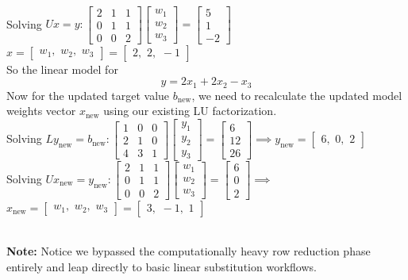 \documentclass[DIV=20,oneside]{scrartcl}
\newcommand{\note}{
	\noindent\textbf{\\Note: }
}
\begin{document}
\\Solving $Ux = y: \begin{bmatrix} 2 & 1 & 1 \\ 0 & 1 & 1 \\ 0 & 0 & 2 \end{bmatrix} \begin{bmatrix} w_1 \\ w_2 \\ w_3 \end{bmatrix} = \begin{bmatrix} 5 \\ 1 \\ -2 \end{bmatrix}$
$x = \begin{bmatrix} w_1, \,\, w_2, \,\, w_3 \end{bmatrix} = \begin{bmatrix} 2, \,\, 2, \,\, -1 \end{bmatrix}$
\\So the linear model for 
$$y=2x_1+2x_2-x_3$$
Now for the updated target value $b_{\text{new}}$, we need to recalculate the updated model weights vector $x_{\text{new}}$ using our existing LU factorization.
\\Solving $Ly_{\text{new}} = b_{\text{new}}:\begin{bmatrix} 1 & 0 & 0 \\ 2 & 1 & 0 \\ 4 & 3 & 1 \end{bmatrix} \begin{bmatrix} y_1 \\ y_2 \\ y_3 \end{bmatrix} = \begin{bmatrix} 6 \\ 12 \\ 26 \end{bmatrix}\implies y_{\text{new}} = \begin{bmatrix} 6, \,\, 0, \,\, 2 \end{bmatrix}$\\
Solving $Ux_{\text{new}} = y_{\text{new}}: \begin{bmatrix} 2 & 1 & 1 \\ 0 & 1 & 1 \\ 0 & 0 & 2 \end{bmatrix} \begin{bmatrix} w_1 \\ w_2 \\ w_3 \end{bmatrix} = \begin{bmatrix} 6 \\ 0 \\ 2 \end{bmatrix}\implies $$x_{\text{new}} = \begin{bmatrix} w_1, \,\, w_2, \,\, w_3 \end{bmatrix} = \begin{bmatrix} 3, \,\, -1, \,\, 1 \end{bmatrix}$
\note Notice we bypassed the computationally heavy row reduction phase entirely and leap directly to basic linear substitution workflows.
\end{document}
